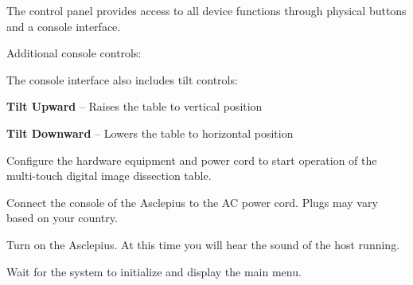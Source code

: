 \documentclass[11pt,a4paper]{article}
\begin{document}

The control panel provides access to all device functions through physical buttons
and a console interface.


\begin{tbkOperationTable}[caption={Control Panel Button Functions},label=tbl:console-buttons]
\end{tbkOperationTable}

Additional console controls:

\begin{tbkTable}[caption={Additional Console Functions}]
\end{tbkTable}

The console interface also includes tilt controls:

\begin{tbkList}
  \item \textbf{Tilt Upward} -- Raises the table to vertical position
  \item \textbf{Tilt Downward} -- Lowers the table to horizontal position
\end{tbkList}


Configure the hardware equipment and power cord to start operation of the
multi-touch digital image dissection table.

\begin{tbkSteps}[prefix=Step]
  \item Connect the console of the Asclepius to the AC power cord.
        Plugs may vary based on your country.
  \item Turn on the Asclepius. At this time you will hear the sound
        of the host running.
  \item Wait for the system to initialize and display the main menu.
\end{tbkSteps}
\end{document}
